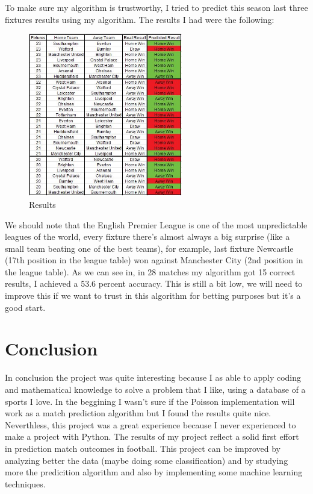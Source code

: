 \documentclass[12pt]{article}
\begin{document}
To make sure my algorithm is trustworthy, I tried to predict this season last three fixtures results using my algorithm. The results I had were the following:

\begin{figure}[!h]
	\center\includegraphics[width=0.6\textwidth]{Capture.jpg}
	\caption{Results}
\end{figure}

We should note that the English Premier League is one of the most unpredictable leagues of the world, every fixture there's almost always a big surprise (like a small team beating one of the best teams), for example, last fixture Newcastle (17th position in the league table) won against Manchester City (2nd position in the league table). As we can see in, in 28 matches my algorithm got 15 correct results, I achieved a 53.6 percent accuracy. This is still a bit low, we will need to improve this if we want to trust in this algorithm for betting purposes but it's a good start. 

\newpage
\section{Conclusion}

In conclusion the project was quite interesting because I as able to apply coding and mathematical knowledge to solve a problem that I like, using a database of a sports I love. In the beggining I wasn't sure if the Poisson implementation will work as a match prediction algorithm but I found the results quite nice. Neverthless, this project was a great experience because I never experienced to make a project with Python. The results of my project reflect a solid first effort in prediction match outcomes in football. This project can be improved by analyzing better the data (maybe doing some classification) and by studying more the predicition algorithm and also by implementing some machine learning techniques.
\end{document}
